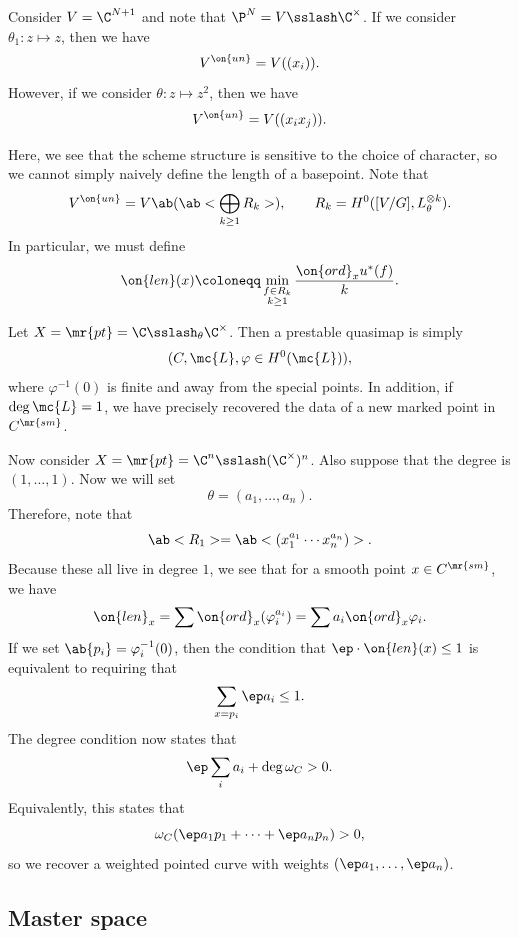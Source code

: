 \begin{exm}
    Consider \(V = \C^{N+1}\) and note that \(\P^N = V \sslash \C^{\times}\). If we consider \(\theta_1 \colon z \mapsto z\), then we have 
    \[ V^{\on{un}} = V((x_i)). \]
    However, if we consider \(\theta \colon z \mapsto z^2\), then we have
    \[ V^{\on{un}} = V((x_i x_j)). \]
\end{exm}

Here, we see that the scheme structure is sensitive to the choice of character, so we cannot simply naively define the length of a basepoint. Note that
\[ V^{\on{un}} = V\ab(\ab< \bigoplus_{k \geq 1} R_k>), \qquad R_k = H^0([V/G], L_{\theta}^{\otimes k}). \]
In particular, we must define
\[ \on{len}(x) \coloneqq \min_{\substack{f \in R_k \\ k \geq 1}} \frac{\on{ord}_x u^*(f)}{k}. \]

\begin{exm}
    Let \(X = \mr{pt} = \C \sslash_{\theta} \C^{\times}\). Then a prestable quasimap is simply
    \[ (C, \mc{L}, \varphi \in H^0(\mc{L})), \]
    where \(\varphi^{-1}(0)\) is finite and away from the special points. In addition, if \(\deg \mc{L} = 1\), we have precisely recovered the data of a new marked point in \(C^{\mr{sm}}\).
\end{exm}

\begin{exm}
    Now consider \(X = \mr{pt} = \C^n \sslash (\C^{\times})^n\). Also suppose that the degree is \((1, \ldots, 1)\). Now we will set
    \[ \theta = (a_1, \ldots, a_n). \]
    Therefore, note that
    \[ \ab<R_1> = \ab<(x_1^{a_1} \cdots x_n^{a_n})>. \]
    Because these all live in degree \(1\), we see that for a smooth point \(x \in C^{\mr{sm}}\), we have
    \[ \on{len}_x = \sum \on{ord}_x (\varphi_i^{a_i}) = \sum a_i \on{ord}_x \varphi_i. \]
    If we set \(\ab\{p_i\} = \varphi_i^{-1}(0)\), then the condition that \(\ep \cdot \on{len}(x) \leq 1\) is equivalent to requiring that 
    \[ \sum_{x = p_i} \ep a_i \leq 1. \]
    The degree condition now states that
    \[ \ep \sum_i a_i + \deg \omega_C > 0. \]
    Equivalently, this states that
    \[ \omega_C(\ep a_1 p_1 + \cdots + \ep a_n p_n) > 0, \]
    so we recover a weighted pointed curve with weights \((\ep a_1, \ldots, \ep a_n)\).
\end{exm}

\subsection{Master space}%
\label{sub:Master space}

